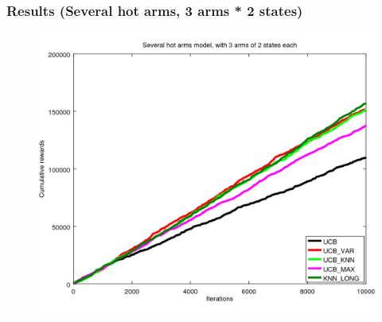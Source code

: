 \documentclass[french]{beamer}
\begin{document}
\begin{frame}
	\frametitle{Results (Several hot arms, 3 arms * 2 states)}

	\begin{figure}[h]
		\begin{center}
			\vspace{-10pt}
			\includegraphics[width=1.05\textheight]{all_m_10000it.png}

			\vspace{-10pt}
		\end{center}
	\end{figure}
\end{frame}
\end{document}
